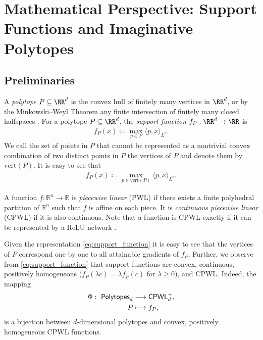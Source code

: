 \section{Mathematical Perspective: Support Functions and Imaginative Polytopes}\label{app:imaginative_polytopes}

\subsection{Preliminaries}\label{subsec:support_app}
A \emph{polytope} $P\subseteq\RR^d$ is the convex hull of finitely many vertices in $\RR^d$, or by the Minkowski–Weyl Theorem any finite intersection of finitely many closed halfspaces .
For a polytope $P\subseteq\RR^d$, the \emph{support function} $f_P:\RR^d\to\RR$ is
\begin{align}
    f_P(x) \coloneqq \max_{p\in P} \langle p, x \rangle_{L^2}.
\end{align}
We call the set of points in $P$ that cannot be represented as a nontrivial convex combination of two distinct points in $P$ the vertices of $P$ and denote them by $\text{vert}(P)$.
It is easy to see that
\begin{align}
    f_P(x) \coloneqq \max_{p\in \text{vert}(P)} \langle p, x \rangle_{L^2}. \label{eq:support_function}
\end{align}

A function $f:\mathbb{R}^n \to \mathbb{R}$ is \emph{piecewise linear} (PWL) if there exists a finite polyhedral partition of $\mathbb{R}^n$ such that $f$ is affine on each piece.
It is \emph{continuous piecewise linear} (CPWL) if it is also continuous. 
Note that a function is CPWL exactly if it can be represented by a ReLU network .

Given the representation \cref{eq:support_function} it is easy to see that the vertices of $P$ correspond one by one to all attainable gradients of $f_P$.
Further, we observe from \cref{eq:support_function} that support functions are convex, continuous, positively homogeneous ($f_P(\lambda c)=\lambda f_P(c)$ for $\lambda\ge 0$), and CPWL. Indeed, the mapping
\begin{align}
    \Phi:\ \mathsf{Polytopes}_d &\longrightarrow \mathsf{CPWL}^+_d, \notag \\
    P &\longmapsto f_P, \label{eq:bijection_cpwl}
\end{align}
is a bijection between $d$-dimensional polytopes and convex, positively homogeneous CPWL functions.

